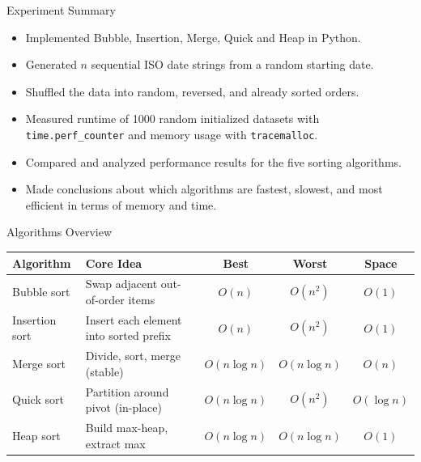 \documentclass[aspectratio=169]{beamer}
\begin{document}
\begin{frame}{Experiment Summary}
  \begin{itemize}
    \item Implemented Bubble, Insertion, Merge, Quick and Heap in Python.
    \item Generated $n$ sequential ISO date strings from a random starting date.
    \item Shuffled the data into random, reversed, and already sorted orders.
    \item Measured runtime of 1000 random initialized datasets with \texttt{time.perf\_counter} and memory usage with \texttt{tracemalloc}.
    \item Compared and analyzed performance results for the five sorting algorithms.
    \item Made conclusions about which algorithms are fastest, slowest, and most efficient in terms of memory and time.
  \end{itemize}
\end{frame}


\begin{frame}{Algorithms Overview}
  \vspace*{-0.5em}
  \scriptsize
  \begin{table}[ht]
    \centering
    \begin{tabular}{@{}l p{7cm} c c c@{}}
      \toprule
      \textbf{Algorithm} & \textbf{Core Idea} & \textbf{Best} & \textbf{Worst} & \textbf{Space} \\
      \midrule
      Bubble sort    & Swap adjacent out-of-order items               & $O(n)$        & $O(n^2)$      & $O(1)$       \\
      Insertion sort & Insert each element into sorted prefix         & $O(n)$        & $O(n^2)$      & $O(1)$       \\
      Merge sort     & Divide, sort, merge (stable)                   & $O(n\log n)$  & $O(n\log n)$  & $O(n)$       \\
      Quick sort     & Partition around pivot (in-place)              & $O(n\log n)$  & $O(n^2)$      & $O(\log n)$  \\
      Heap sort      & Build max-heap, extract max                    & $O(n\log n)$  & $O(n\log n)$  & $O(1)$       \\
      \bottomrule
    \end{tabular}
  \end{table}
\end{frame}
\end{document}
